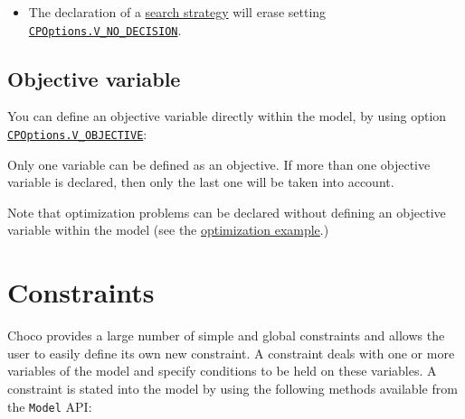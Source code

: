 \begin{note}
  \begin{itemize}
  \item The declaration of a \hyperlink{solver:searchstrategy}{search strategy} will erase setting \hyperlink{vnodecision:vnodecisionoptions}{\tt CPOptions.V\_NO\_DECISION}.
  \end{itemize}
\end{note}

\subsection{Objective variable}\label{model:objectivevariable}\hypertarget{model:objectivevariable}{}
You can define an objective variable directly within the model, by using option \hyperlink{vobjective:vobjectiveoptions}{\tt CPOptions.V\_OBJECTIVE}:


Only one variable can be defined as an objective. If more than one objective variable is declared, then only the last one will be taken into account.

Note that optimization problems can be declared without defining an objective variable within the model (see the \hyperlink{solver:optimization}{optimization example}.)


\section{Constraints}\label{model:constraints}\hypertarget{model:constraints}{}
Choco provides a large number of simple and global constraints and allows the user to easily define its own new constraint.
A constraint deals with one or more variables of the model and specify conditions to be held on these variables. 
A constraint is stated into the model by using the following methods available from the \texttt{Model} API: 

